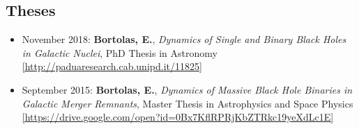 \subsection*{Theses}


\begin{itemize}
   \item {\normalfont November 2018:} {\bf Bortolas, E.}, {\it Dynamics of Single and Binary Black Holes in Galactic Nuclei}, PhD Thesis in Astronomy \href{http://paduaresearch.cab.unipd.it/11825}{\scriptsize [http://paduaresearch.cab.unipd.it/11825]}
  \item {\normalfont September 2015:} {\bf Bortolas, E.}, {\it Dynamics of Massive Black Hole Binaries in Galactic Merger Remnants}, Master Thesis in Astrophysics and Space Physics \href{https://drive.google.com/open?id=0Bx7KflRPRjKbZTRkc19yeXdLc1E}{\scriptsize [https://drive.google.com/open?id=0Bx7KflRPRjKbZTRkc19yeXdLc1E]}
\end{itemize}
